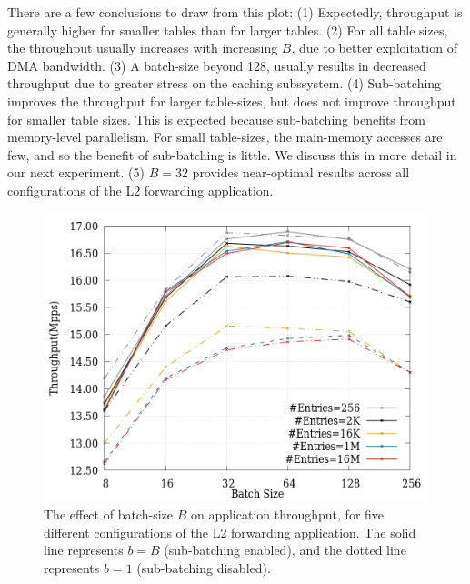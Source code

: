 There are a few conclusions to draw from this plot: (1) Expectedly, throughput is generally higher
for smaller tables than for larger tables. (2) For all table sizes, the throughput usually increases with
increasing $B$, due to better exploitation of DMA bandwidth. (3) A batch-size beyond 128, usually results in
decreased throughput due to greater stress on the caching subssystem. (4) Sub-batching improves the throughput
for larger table-sizes, but does not improve throughput for smaller table sizes. This is expected
because sub-batching benefits from memory-level parallelism. For small table-sizes, the main-memory
accesses are few, and so the benefit of sub-batching is little. We discuss this in more detail
in our next experiment. (5) $B=32$ provides near-optimal results across all configurations of the
L2 forwarding application.

\begin{figure}[ht]
\includegraphics[width = \linewidth]{Figures/TableSizeVsbatchSize.png}
\caption{The effect of batch-size $B$ on application throughput, for five different configurations of the L2 forwarding application. The solid line represents $b=B$ (sub-batching enabled), and the dotted line represents $b=1$ (sub-batching disabled).}
\label{fig:tablesize}
\end{figure}

